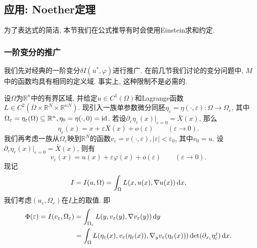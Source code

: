 \subsection{应用: Noether定理}

为了表达式的简洁, 本节我们在公式推导有时会使用Einstein求和约定.

\subsubsection{一阶变分的推广}

我们先对经典的一阶变分$\delta I(u^*, \varphi)$进行推广. 在前几节我们讨论的变分问题中, $M$中的函数均具有相同的定义域.
事实上, 这种限制不是必需的.

设$\Omega$为$\mathbb{R}^n$中的有界区域, 并给定$u \in C^1(\Omega)$和Lagrange函数$L \in C^2(\overline{\Omega} \times \mathbb{R}^N \times \mathbb{R}^{nN})$.
现引入一族单参数微分同胚$\eta_{\varepsilon} = \eta(\cdot, \varepsilon)\colon \Omega \rightarrow \Omega_{\varepsilon}$,  其中$\Omega_{\varepsilon} = \eta_{\varepsilon}(\Omega) \subseteq \mathbb{R}^n, \eta_0 = \eta( \cdot, 0) = {\rm id}$.
若设$\partial_{\varepsilon}\eta_{\varepsilon}(x)|_{\varepsilon = 0} = \bar{X}(x)$, 那么
\begin{equation}\label{25}
    \eta_{\varepsilon}(x) = x + \varepsilon\bar{X}(x) + o(\varepsilon) \qquad (\varepsilon \rightarrow 0).
\end{equation}
我们再考虑一族从$\Omega_{\varepsilon}$映到$\mathbb{R}^N$的函数$v_{\varepsilon} = v( \cdot, \varepsilon), |\varepsilon| < \varepsilon_0$, 其中$v_0 = u$.
设$\partial_{\varepsilon}\eta_{\varepsilon}(x)|_{\varepsilon = 0} = \bar{X}(x)$, 则有
\begin{equation*}
    v_{\varepsilon}(x) = u(x) + \varepsilon\varphi(x) + o(\varepsilon) \qquad (\varepsilon \rightarrow 0).
\end{equation*}
现记 
\begin{equation*}
    I = I(u, \Omega) = \int_{\Omega}L(x,u(x), \nabla u(x)) \,{\rm d}x,
\end{equation*}
我们考虑$(u_{\varepsilon}, \Omega_{\varepsilon})$在$I$上的取值. 即
\begin{align*}
    \Phi(\varepsilon) = I(v_{\varepsilon}, \Omega_{\varepsilon}) &= \int_{\Omega_{\varepsilon}}L(y, v_{\varepsilon}(y), \nabla v_{\varepsilon}(y)) \,{\rm d}y \\
    &= \int_{\Omega}L(\eta_{\varepsilon}(x), v_{\varepsilon}(\eta_{\varepsilon}(x)), \nabla_y v_{\varepsilon}(\eta_{\varepsilon}(x))) \det(\partial_{x_i}\eta_{\varepsilon}^j) \,{\rm d}x.
\end{align*} 
